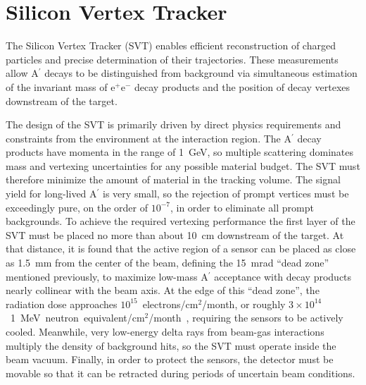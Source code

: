 \documentclass[final,3p,times,twocolumn]{elsarticle}
\newcommand{\Aprime}{A\ensuremath{^\prime}}
\newcommand{\ee}{e$^+$e$^-$}
\newcommand{\fluenceunit}{1~MeV~neutron~equivalent/cm\ensuremath{^2}}
\begin{document}

\section{Silicon Vertex Tracker}
\label{svt}

The Silicon Vertex Tracker (SVT) enables efficient reconstruction of charged particles and precise 
determination of their trajectories. These measurements allow \Aprime{} decays to be distinguished 
from background via simultaneous estimation of the invariant mass of \ee{} decay products and the 
position of decay vertexes downstream of the target. 

The design of the SVT is primarily driven by direct physics requirements and constraints from the 
environment at the interaction region. The \Aprime{} decay products 
have momenta in the range of 1~GeV, so multiple scattering dominates mass and vertexing 
uncertainties for any possible material budget. The SVT must therefore minimize the amount of 
material in the tracking volume. The signal yield for long-lived \Aprime{} is very small, so 
the rejection of prompt vertices must be exceedingly pure, on the order of $10^{-7}$, in order to 
eliminate all prompt backgrounds. To achieve the required vertexing performance the first layer of the 
SVT must be placed no more than about 10~cm downstream of the target. At that distance, it is found 
that the active region of a sensor can be placed as close as 1.5~mm from the center of the beam, 
defining the 15~mrad ``dead zone'' mentioned previously, to maximize low-mass \Aprime{} acceptance 
with decay products nearly collinear with the beam axis. At the edge of this ``dead zone'', the 
radiation dose approaches $10^{15}$~electrons/cm$^2$/month, or roughly 
$3 \times 10^{14}$~\fluenceunit{}/month~\cite{Rashevskaya:2002nd}, 
requiring the sensors to be actively cooled.
Meanwhile, very low-energy delta rays from 
beam-gas interactions multiply the density of background hits, so the SVT must operate inside the 
beam vacuum.  Finally, in order to protect the sensors, the detector must be movable so that it can be 
retracted during periods of uncertain beam conditions.  
\end{document}
